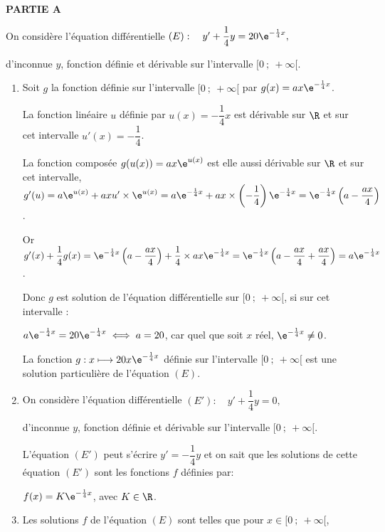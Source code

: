 \medskip

\textbf{PARTIE A}

\medskip

On considère l'équation différentielle 
$(E) : \quad y' +\dfrac14y = 20\e^{-\frac14 x},$

d'inconnue $y$, fonction définie et dérivable sur l'intervalle $[0~;~ +\infty[$.

\medskip

\begin{enumerate}
\item 
Soit $g$ la fonction  définie sur l'intervalle $[0~;~+\infty[$ par $g(x) = ax\e^{-\frac14 x}$.

La fonction linéaire $u$ définie par $u(x) = - \dfrac14 x$ est dérivable sur $\R$ et sur cet intervalle $u'(x) = - \dfrac14$.

La fonction composée $g(u(x)) = ax\e^{u(x)}$ est elle aussi dérivable sur $\R$ et sur cet intervalle, $g'(u) = a\e^{u(x)} + axu' \times \e^{u(x)} = a\e^{-\frac14 x} + ax \times \left(- \dfrac14 \right)\e^{-\frac14 x} = \e^{-\frac14 x}\left(a - \dfrac{ax}{4}\right)$.

Or $g'(x) + \dfrac14g(x) = \e^{-\frac14 x}\left(a - \dfrac{ax}{4}\right) + \dfrac14 \times ax\e^{-\frac14 x} = \e^{-\frac14 x}\left(a - \dfrac{ax}{4} + \dfrac{ax}{4} \right) = a\e^{-\frac14 x}$.

Donc $g$ est solution de l'équation différentielle sur $[0~;~ +\infty[$, si sur cet intervalle :

$a\e^{-\frac14 x} = 20\e^{-\frac14 x} \iff a = 20$, car quel que soit $x$ réel, $\e^{-\frac14 x} \ne 0$.

La fonction $g : x \longmapsto 20x \e^{-\frac14 x}$ définie sur l'intervalle $[0~;~ +\infty[$ est une solution particulière de l'équation $(E)$.

\item On considère l'équation différentielle 
$(E') : \quad y' +\dfrac14 y = 0,$

d'inconnue $y$, fonction définie et dérivable sur l'intervalle $[0~;~ +\infty[$.


L'équation $(E')$ peut s'écrire $y' = - \dfrac14y$ et on sait que les solutions de cette équation $(E')$ sont les fonctions $f$ définies par:

$f(x) = K\e^{-\frac14 x}$, avec $K \in \R$.

\item 
Les solutions $f$ de l'équation $(E)$ sont telles que pour $x \in [0~;~+ \infty[$, 


\end{enumerate}
